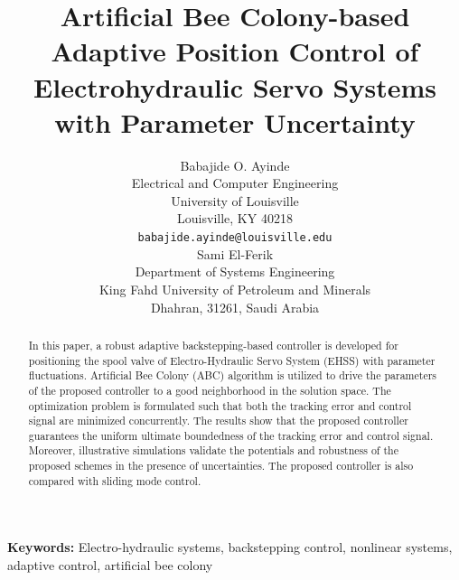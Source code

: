 \documentclass{article} %
\title{Artificial Bee Colony-based Adaptive Position Control of Electrohydraulic Servo Systems with Parameter Uncertainty}
\author{
Babajide O. Ayinde \\
Electrical and Computer Engineering\\
University of Louisville\\
Louisville, KY 40218 \\
\texttt{babajide.ayinde@louisville.edu} \\
\And
Sami El-Ferik\\
Department of Systems Engineering \\
King Fahd University of Petroleum and Minerals \\
Dhahran, 31261, Saudi Arabia\\
}
\begin{document}
\maketitle

\begin{abstract}
In this paper, a robust adaptive backstepping-based controller is developed for positioning the spool valve of Electro-Hydraulic Servo System (EHSS) with parameter fluctuations. Artificial Bee Colony (ABC) algorithm is utilized to drive the parameters of the proposed controller to a good neighborhood in the solution space. The optimization problem is formulated such that both the tracking error and control signal are minimized concurrently. The results show that the proposed controller guarantees the uniform ultimate boundedness of the tracking error and control signal. Moreover, illustrative simulations validate the potentials and robustness of the proposed schemes in the presence of uncertainties. The proposed controller is also compared with sliding mode control.
\end{abstract}

\textbf{Keywords:} Electro-hydraulic systems, backstepping control, nonlinear systems, adaptive control, artificial bee colony
\end{document}
